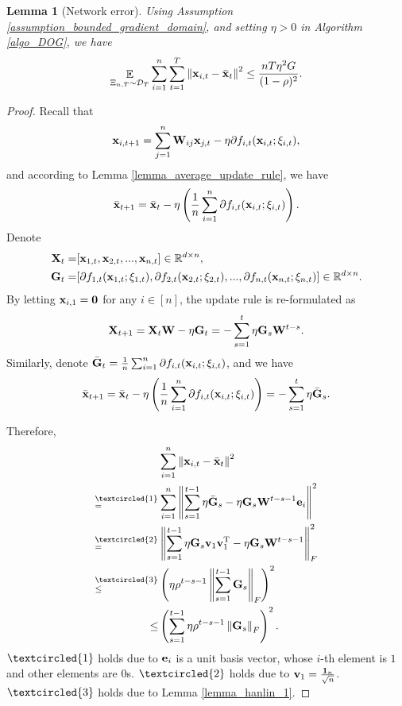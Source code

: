 \documentclass{article}
\newtheorem{Lemma}{\bf{Lemma}}
\begin{document}
\begin{Lemma}[Network error]
\label{lemma_x_variance_norm_square}
Using Assumption \ref{assumption_bounded_gradient_domain}, and setting $\eta>0$ in Algorithm \ref{algo_DOG}, we have 
\begin{align}
\nonumber
\mathop{\mathbb{E}}_{ \Xi_{n,T} \sim \mathcal{D}_{T} } \sum_{i=1}^n\sum_{t=1}^T \left\lVert{\bf x}_{i,t} - \bar{{\bf x}}_t\right\rVert^2 \le \frac{nT\eta^2 G }{(1-\rho)^2}.
\end{align}

\end{Lemma}
\begin{proof}


Recall that 
\begin{align}
\nonumber
{\bf x}_{i,t+1} = \sum_{j=1}^n {\bf W}_{ij}{\bf x}_{j,t} - \eta \partial f_{i,t}({\bf x}_{i,t};\xi_{i,t}), 
\end{align} and according to Lemma \ref{lemma_average_update_rule}, we have 
\begin{align}
\nonumber
\bar{{\bf x}}_{t+1} = \bar{{\bf x}}_t - \eta \left( \frac{1}{n}\sum_{i=1}^n \partial f_{i,t}({\bf x}_{i,t};\xi_{i,t}) \right).
\end{align} Denote 
\begin{align}
\nonumber
{\bf X}_t = &  [{\bf x}_{1,t}, {\bf x}_{2,t}, ..., {\bf x}_{n,t}] \in \mathbb{R}^{d\times n}, \\ \nonumber
{\bf G}_t = & [\partial f_{1,t}({\bf x}_{1,t};\xi_{1,t}), \partial f_{2,t}({\bf x}_{2,t};\xi_{2,t}), ..., \partial f_{n,t}({\bf x}_{n,t};\xi_{n,t})] \in \mathbb{R}^{d\times n}.
\end{align} By letting ${\bf x}_{i,1} = {\bf 0}$ for any $i\in[n]$, the update rule is re-formulated as 
\begin{align}
\nonumber
{\bf X}_{t+1} = {\bf X}_t {\bf W} - \eta {\bf G}_t = - \sum_{s=1}^t \eta {\bf G}_s {\bf W}^{t-s}. 
\end{align} Similarly, denote $\bar{{\bf G}}_t = \frac{1}{n}\sum_{i=1}^n \partial f_{i,t}({\bf x}_{i,t};\xi_{i,t})$, and we have
\begin{align}
\bar{{\bf x}}_{t+1} = \bar{{\bf x}}_t - \eta \left( \frac{1}{n}\sum_{i=1}^n \partial f_{i,t}({\bf x}_{i,t};\xi_{i,t}) \right) = - \sum_{s=1}^t \eta \bar{{\bf G}}_s. 
\end{align}


Therefore, 
\begin{align}
\nonumber
& \sum_{i=1}^n \lrnorm{\x_{i,t} - \bar{\x}_t}^2 \\ \nonumber
\refabovecir{=}{\textcircled{1}} & \sum_{i=1}^n \lrnorm{ \sum_{s=1}^{t-1} \eta \bar{\G}_s - \eta \G_s \W^{t-s-1}\e_i }^2   \\ \nonumber
\refabovecir{=}{\textcircled{2}} & \lrnorm{ \sum_{s=1}^{t-1} \eta \G_s\v_1 \v_1\Tr - \eta \G_s \W^{t-s-1} }^2_F   \\ \nonumber
\refabovecir{\le}{\textcircled{3}} & \lrincir{ \eta \rho^{t-s-1} \lrnorm{\sum_{s=1}^{t-1}\G_s}_F}^2 \\ \nonumber
\le & \lrincir{ \sum_{s=1}^{t-1} \eta \rho^{t-s-1} \lrnorm{\G_s}_F}^2.
\end{align} $\textcircled{1}$ holds due to ${\bf e}_i$ is a unit basis vector, whose $i$-th element is $1$ and other elements are $0$s. $\textcircled{2}$ holds due to ${\bf v}_1 = \frac{{\bf 1}_n}{\sqrt{n}}$. $\textcircled{3}$ holds due to Lemma \ref{lemma_hanlin_1}. 



\end{proof}
\end{document}
